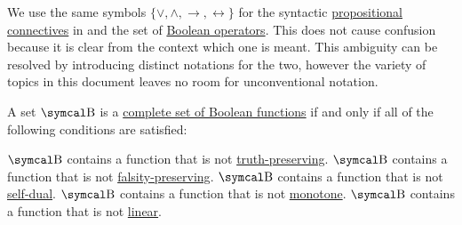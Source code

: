 \begin{remark}\label{remark:propositional_connectives_ambiguity}
  We use the same symbols \( \{ \vee, \wedge, \rightarrow, \leftrightarrow \} \) for the syntactic \hyperref[def:propositional_alphabet/connectives]{propositional connectives} in  and the set of \hyperref[def:standard_boolean_operators]{Boolean operators}. This does not cause confusion because it is clear from the context which one is meant. This ambiguity can be resolved by introducing distinct notations for the two, however the variety of topics in this document leaves no room for unconventional notation.
\end{remark}

\begin{theorem}\label{thm:posts_completeness_theorem}
  A set \( \CB \) is a \hyperref[def:boolean_closure]{complete set of Boolean functions} if and only if all of the following conditions are satisfied:
  \begin{PropEnum}
     \( \CB \) contains a function that is not \hyperref[def:boolean_functions_in_f2/truth_preserving]{truth-preserving}.
     \( \CB \) contains a function that is not \hyperref[def:boolean_functions_in_f2/falsity_preserving]{falsity-preserving}.
     \( \CB \) contains a function that is not \hyperref[def:boolean_functions_in_f2/self_dual]{self-dual}.
     \( \CB \) contains a function that is not \hyperref[def:boolean_functions_in_f2/monotone]{monotone}.
     \( \CB \) contains a function that is not \hyperref[def:boolean_functions_in_f2/linear]{linear}.
  \end{PropEnum}
\end{theorem}

